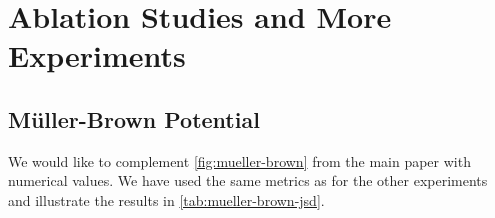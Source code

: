 \section{Ablation Studies and More Experiments}

\subsection{Müller-Brown Potential} \label{appx:mueller-brown}
We would like to complement \cref{fig:mueller-brown} from the main paper with numerical values. We have used the same metrics as for the other experiments and illustrate the results in \cref{tab:mueller-brown-jsd}.

\begin{table}[h]
\centering
{}
\vspace{0.2cm}
\caption{Comparison of methods based on \gls{JS} Divergence and the \gls{PMF} error. Lower values are better. To compute the standard deviation, we have trained ten different models and performed sampling/simulation with them. As for the reference, we have started multiple simulations with a different seed on the same ground-truth potential. This serves as a reference of what could optimally be achieved.}
\label{tab:mueller-brown-jsd}
\end{table}

